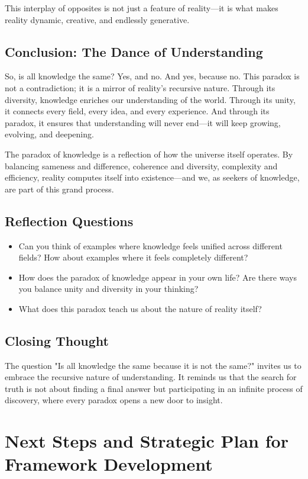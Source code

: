 \documentclass[12pt]{article}
\begin{document}
This interplay of opposites is not just a feature of reality—it is what makes reality dynamic, creative, and endlessly generative.

\subsection*{Conclusion: The Dance of Understanding}
So, is all knowledge the same? Yes, and no. And yes, because no. This paradox is not a contradiction; it is a mirror of reality's recursive nature. Through its diversity, knowledge enriches our understanding of the world. Through its unity, it connects every field, every idea, and every experience. And through its paradox, it ensures that understanding will never end—it will keep growing, evolving, and deepening.

The paradox of knowledge is a reflection of how the universe itself operates. By balancing sameness and difference, coherence and diversity, complexity and efficiency, reality computes itself into existence—and we, as seekers of knowledge, are part of this grand process.

\subsection*{Reflection Questions}
\begin{itemize}
    \item Can you think of examples where knowledge feels unified across different fields? How about examples where it feels completely different?
    \item How does the paradox of knowledge appear in your own life? Are there ways you balance unity and diversity in your thinking?
    \item What does this paradox teach us about the nature of reality itself?
\end{itemize}

\subsection*{Closing Thought}
The question "Is all knowledge the same because it is not the same?" invites us to embrace the recursive nature of understanding. It reminds us that the search for truth is not about finding a final answer but participating in an infinite process of discovery, where every paradox opens a new door to insight.


\section{Next Steps and Strategic Plan for Framework Development}
\end{document}
